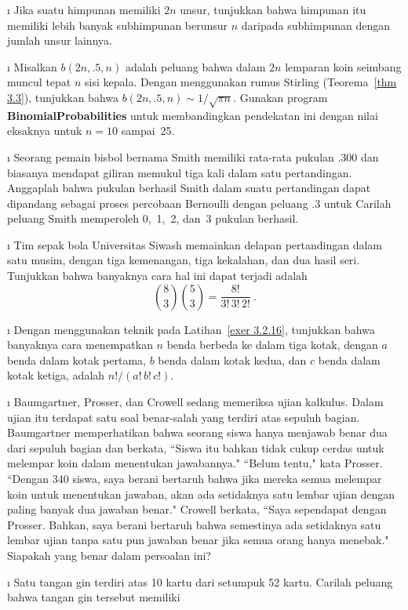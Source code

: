 \begin{LJSItem}
\i\label{exer 3.2.13} Jika suatu himpunan memiliki $2n$ unsur, tunjukkan bahwa
himpunan itu memiliki lebih banyak subhimpunan berunsur $n$ daripada subhimpunan dengan
jumlah unsur lainnya.

\i\label{exer 3.2.14} Misalkan $b(2n,.5,n)$ adalah peluang bahwa dalam $2n$ lemparan
koin seimbang muncul tepat $n$ sisi kepala.  Dengan menggunakan rumus Stirling
(Teorema~\ref{thm 3.3}), tunjukkan bahwa $b(2n,.5,n)
\sim 1/\sqrt{\pi n}$.  Gunakan program {\bf BinomialProbabilities} untuk membandingkan
pendekatan ini dengan nilai eksaknya untuk $n = 10$ sampai~25.

\i\label{exer 3.2.15} Seorang pemain bisbol bernama Smith memiliki rata-rata pukulan
$.300$ dan biasanya mendapat giliran memukul tiga kali dalam satu pertandingan.
Anggaplah bahwa pukulan berhasil Smith dalam suatu pertandingan dapat dipandang sebagai
proses percobaan Bernoulli dengan peluang .3 untuk  Carilah peluang
Smith memperoleh 0,~1,~2, dan~3 pukulan berhasil.

\i\label{exer 3.2.16} Tim sepak bola Universitas Siwash memainkan delapan pertandingan
dalam satu musim, dengan tiga kemenangan, tiga kekalahan, dan dua hasil seri.  Tunjukkan
bahwa banyaknya cara hal ini dapat terjadi adalah
$$ {8 \choose 3}{5 \choose 3} = \frac {8!}{3!\,3!\,2!}\ .
$$

\i\label{exer 3.2.17} Dengan menggunakan teknik pada Latihan~\ref{exer 3.2.16},
tunjukkan bahwa banyaknya cara menempatkan $n$ benda berbeda ke dalam tiga kotak,
dengan $a$ benda dalam kotak pertama, $b$ benda dalam kotak kedua, dan $c$ benda dalam
kotak ketiga, adalah $n!/(a!\,b!\,c!)$.

\i\label{exer 3.2.18} Baumgartner, Prosser, dan Crowell sedang memeriksa ujian
kalkulus.  Dalam ujian itu terdapat satu soal benar-salah yang terdiri atas sepuluh
bagian.  Baumgartner memperhatikan bahwa seorang siswa hanya menjawab benar dua dari
sepuluh bagian dan berkata, ``Siswa itu bahkan tidak cukup cerdas untuk melempar koin
dalam menentukan jawabannya."  ``Belum tentu," kata Prosser.  ``Dengan 340 siswa, saya
berani bertaruh bahwa jika mereka semua melempar koin untuk menentukan jawaban, akan ada
setidaknya satu lembar ujian dengan paling banyak dua jawaban benar." Crowell berkata,
``Saya sependapat dengan Prosser.  Bahkan, saya berani bertaruh bahwa semestinya ada
setidaknya satu lembar ujian tanpa satu pun jawaban benar jika semua orang hanya
menebak."  Siapakah yang benar dalam persoalan ini?

\i\label{exer 3.2.19} Satu tangan gin terdiri atas 10 kartu dari setumpuk 52 kartu.
Carilah peluang bahwa tangan gin tersebut memiliki


\end{LJSItem}

